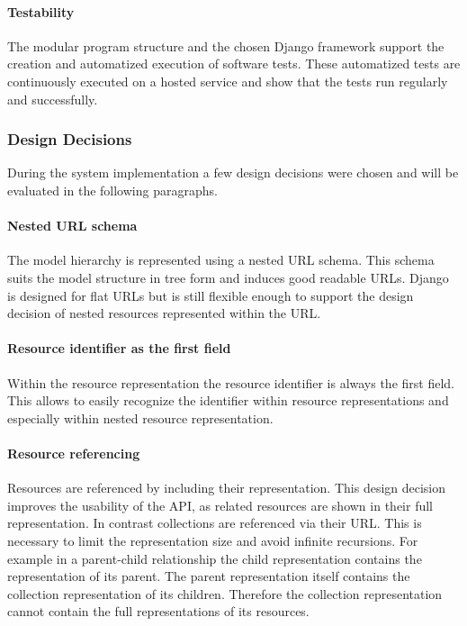 \paragraph{Testability}

The modular program structure and the chosen Django framework support the creation and automatized execution of software tests.
These automatized tests are continuously executed on a hosted service and show that the tests run regularly and successfully.



\subsubsection{Design Decisions}

During the system implementation a few design decisions were chosen and will be evaluated in the following paragraphs.

\paragraph{Nested URL schema}

The model hierarchy is represented using a nested URL schema.
This schema suits the model structure in tree form and induces good readable URLs.
Django is designed for flat URLs but is still flexible enough to support the design decision of nested resources represented within the URL.

\paragraph{Resource identifier as the first field}

Within the resource representation the resource identifier is always the first field.
This allows to easily recognize the identifier within resource representations and especially within nested resource representation.

\paragraph{Resource referencing}

Resources are referenced by including their representation.
This design decision improves the usability of the API, as related resources are shown in their full representation.
In contrast collections are referenced via their URL.
This is necessary to limit the representation size and avoid infinite recursions.
For example in a parent-child relationship the child representation contains the representation of its parent.
The parent representation itself contains the collection representation of its children.
Therefore the collection representation cannot contain the full representations of its resources.

